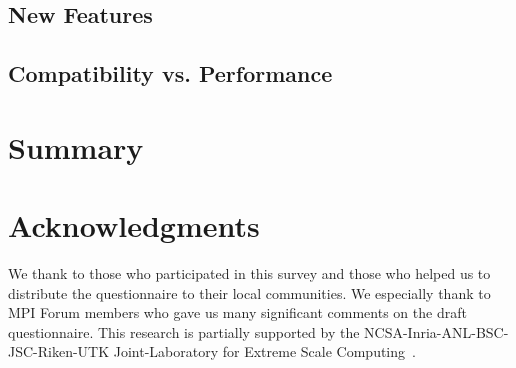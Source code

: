 \documentclass[conference,10pt,letterpaper]{IEEEtran}
\begin{document}
\subsection{New Features}

\subsection{Compatibility vs. Performance}

\section{Summary}

\section*{Acknowledgments}
We thank to those who participated in this survey and those who
helped us to distribute the questionnaire to their local
communities. We especially thank to MPI Forum members who gave us many
significant comments on the draft questionnaire.
This research is partially supported by the
NCSA-Inria-ANL-BSC-JSC-Riken-UTK Joint-Laboratory for Extreme Scale
Computing~\cite{JLESC}.



\end{document}
